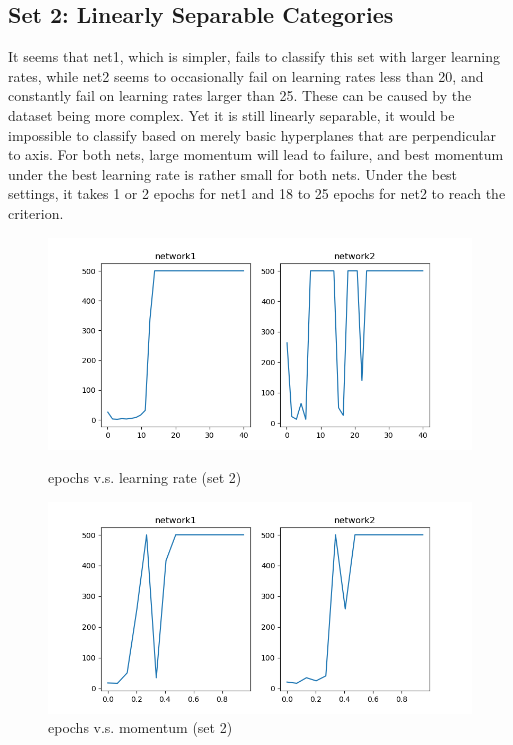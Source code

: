 \documentclass{article}
\begin{document}
\subsection*{Set 2: Linearly Separable Categories}
It seems that net1, which is simpler, fails to classify this set with larger learning rates, while net2 seems to occasionally fail on learning rates less than 20, and constantly fail on learning rates larger than 25. These can be caused by the dataset being more complex. Yet it is still linearly separable, it would be impossible to classify based on merely basic hyperplanes that are perpendicular to axis. For both nets, large momentum will lead to failure, and best momentum under the best learning rate is rather small for both nets. Under the best settings, it takes 1 or 2 epochs for net1 and 18 to 25 epochs for net2 to reach the criterion.
\begin{figure}[!ht]
    \begin{minipage}{0.5\textwidth}
        \centering
        \includegraphics[width=\linewidth]{part1set2.png} 
        \caption{epochs v.s. learning rate (set 2)}   
    \end{minipage}\hfill
    \begin{minipage}{0.5\textwidth}
        \centering
        \includegraphics[width=\linewidth]{part1set2m.png}    
        \caption{epochs v.s. momentum (set 2)}
    \end{minipage}
\end{figure}
\end{document}
